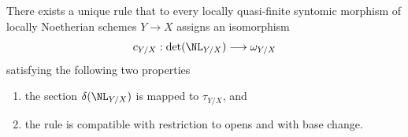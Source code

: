 %

\begin{proposition}
\label{proposition-tate-map}
There exists a unique rule that to every locally quasi-finite syntomic
morphism of locally Noetherian schemes $Y \to X$ assigns an isomorphism
$$
c_{Y/X} : \det(\NL_{Y/X}) \longrightarrow \omega_{Y/X}
$$
satisfying the following two properties
\begin{enumerate}
\item the section $\delta(\NL_{Y/X})$ is mapped to $\tau_{Y/X}$, and
\item the rule is compatible with restriction to opens and with
base change.
\end{enumerate}
\end{proposition}

